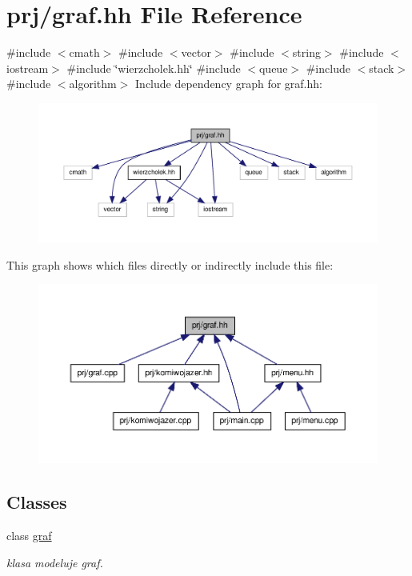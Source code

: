 \hypertarget{graf_8hh}{\section{prj/graf.hh \-File \-Reference}
\label{graf_8hh}
}
{\ttfamily \#include $<$cmath$>$}\*
{\ttfamily \#include $<$vector$>$}\*
{\ttfamily \#include $<$string$>$}\*
{\ttfamily \#include $<$iostream$>$}\*
{\ttfamily \#include \char`\"{}wierzcholek.\-hh\char`\"{}}\*
{\ttfamily \#include $<$queue$>$}\*
{\ttfamily \#include $<$stack$>$}\*
{\ttfamily \#include $<$algorithm$>$}\*
\-Include dependency graph for graf.\-hh\-:\nopagebreak
\begin{figure}[H]
\begin{center}
\leavevmode
\includegraphics[width=350pt]{graf_8hh__incl}
\end{center}
\end{figure}
\-This graph shows which files directly or indirectly include this file\-:
\nopagebreak
\begin{figure}[H]
\begin{center}
\leavevmode
\includegraphics[width=350pt]{graf_8hh__dep__incl}
\end{center}
\end{figure}
\subsection*{\-Classes}
\begin{DoxyCompactItemize}
\item 
class \hyperlink{classgraf}{graf}
\begin{DoxyCompactList}\small\item\em klasa modeluje graf. \end{DoxyCompactList}\end{DoxyCompactItemize}
